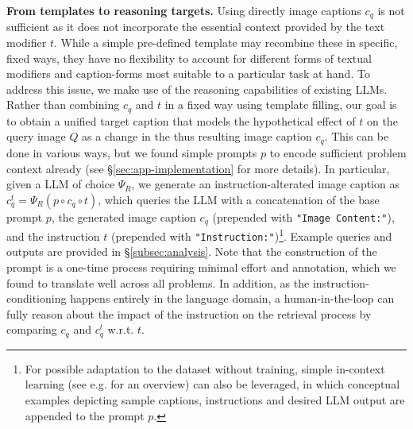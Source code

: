 \documentclass{article} \usepackage{iclr2024_conference,times}
\begin{document}
\textbf{From templates to reasoning targets.} Using directly image captions $c_q$ is not sufficient as it does not incorporate the essential context provided by the text modifier $t$. While a simple pre-defined template may recombine these in specific, fixed ways, they have no flexibility to account for different forms of textual modifiers and caption-forms most suitable to a particular task at hand. To address this issue, we make use of the reasoning capabilities of existing LLMs. Rather than combining $c_q$ and $t$ in a fixed way using template filling, our goal is to obtain a unified target caption that models the hypothetical effect of $t$ on the query image $Q$ as a change in the thus resulting image caption $c_q$.
This can be done in various ways, but we found simple prompts $p$ to encode sufficient problem context already (see \S\ref{sec:app-implementation} for more details). 
In particular, given a LLM of choice $\Psi_R$, we generate an instruction-alterated image caption as $c_q^t = \Psi_R(p \circ c_q \circ t)$, which queries the LLM with a concatenation of the base prompt $p$, the generated image caption $c_q$ (prepended with \texttt{"Image Content:"}), and the instruction $t$ (prepended with \texttt{"Instruction:"})\footnote{For possible adaptation to the dataset without training, simple in-context learning (see e.g. \cite{dong2023survey} for an overview) can also be leveraged, in which conceptual examples depicting sample captions, instructions and desired LLM output are appended to the prompt $p$.}. Example queries and outputs are provided in \S\ref{subsec:analysis}. 
Note that the construction of the prompt is a one-time process requiring minimal effort and annotation, which we found to translate well across all problems. In addition, as the instruction-conditioning happens entirely in the language domain, a human-in-the-loop can fully reason about the impact of the instruction on the retrieval process by comparing $c_q$ and $c_q^t$ w.r.t. $t$.
\end{document}
